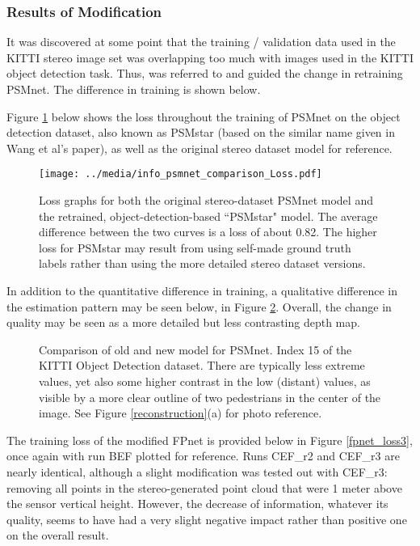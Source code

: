 \subsubsection{Results of Modification}
It was discovered at some point that the training / validation data used in the KITTI stereo image set was overlapping too much with images used in the KITTI object detection task. Thus, \cite{wang_pseudo-lidar_2019} was referred to and guided the change in retraining PSMnet. The difference in training is shown below.

Figure \ref{psmnet_star_train_info} below shows the loss throughout the training of PSMnet on the object detection dataset, also known as PSMstar (based on the similar name given in Wang et al's paper), as well as the original stereo dataset model for reference. 

\begin{figure}[ht]
	\centering
	\texttt{[image: ../media/info\_psmnet\_comparison\_Loss.pdf]}
	\caption{Loss graphs for both the original stereo-dataset PSMnet model and the retrained, object-detection-based ``PSMstar" model. The average difference between the two curves is a loss of about 0.82. The higher loss for PSMstar may result from using self-made ground truth labels rather than using the more detailed stereo dataset versions.}
	\label{psmnet_star_train_info}
\end{figure}

In addition to the quantitative difference in training, a qualitative difference in the estimation pattern may be seen below, in Figure \ref{new_psmnet}. Overall, the change in quality may be seen as a more detailed but less contrasting depth map.

\begin{figure}[H]
	\centering
	\caption{Comparison of old and new model for PSMnet. Index 15 of the KITTI Object Detection dataset. There are typically less extreme values, yet also some higher contrast in the low (distant) values, as visible by a more clear outline of two pedestrians in the center of the image. See Figure \ref{reconstruction}(a) for photo reference.}
	\label{new_psmnet}
\end{figure}


The training loss of the modified FPnet is provided below in Figure \ref{fpnet_loss3}, once again with run BEF plotted for reference. Runs CEF\_r2 and CEF\_r3 are nearly identical, although a slight modification was tested out with CEF\_r3: removing all points in the stereo-generated point cloud that were 1 meter above the sensor vertical height. However, the decrease of information, whatever its quality, seems to have had a very slight negative impact rather than positive one on the overall result.

